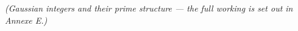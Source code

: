 % 
% 
% 
\textit{(Gaussian integers and their prime structure --- the full working is set out in Annexe E.)}

% 
% 
% 
